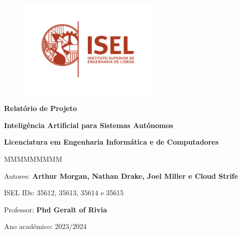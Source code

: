 \begin{figure}
    \centering
    \includegraphics[width=0.6\textwidth]{../../docs/images/logo-isel}
    \label{fig:isel-logo}
\end{figure}

\begin{center}

    \vspace*{2cm} %

    \textbf{\Huge{}Relatório de Projeto}

    \vspace{1cm}

    \textbf{\LARGE{}Inteligência Artificial para Sistemas Autónomos}

    \textbf{\large{}Licenciatura em Engenharia Informática e de Computadores}{\huge\par}


    \vfill{} %

    \begin{lyxlist}{MMMMMMMMM}
        \begin{singlespace}
            \item [{Autores:}] \textbf{Arthur Morgan, Nathan Drake, Joel Miller e Cloud Strife }
            \item [{ISEL IDs:}]  35612, 35613, 35614 e 35615
            \item [{Professor:}] \textbf{Phd Geralt of Rivia}
            \item [{Ano académico:}] 2023/2024
        \end{singlespace}
    \end{lyxlist}
\end{center}
